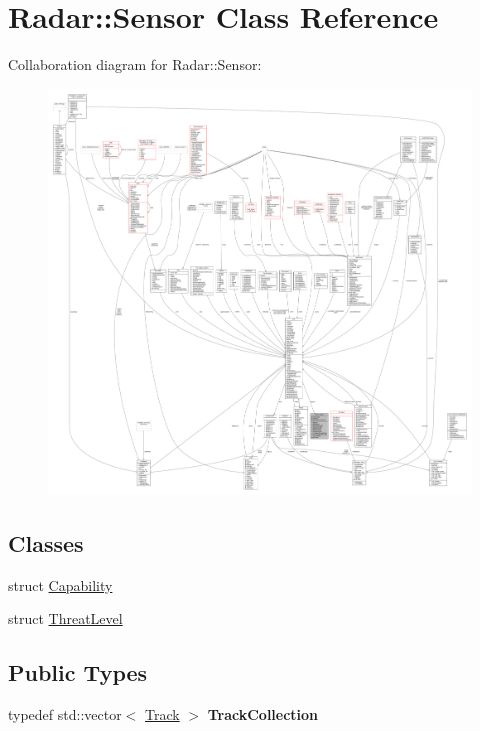 \hypertarget{classRadar_1_1Sensor}{}\section{Radar\+:\+:Sensor Class Reference}
\label{classRadar_1_1Sensor}


Collaboration diagram for Radar\+:\+:Sensor\+:
\nopagebreak
\begin{figure}[H]
\begin{center}
\leavevmode
\includegraphics[width=350pt]{d1/dc8/classRadar_1_1Sensor__coll__graph}
\end{center}
\end{figure}
\subsection*{Classes}
\begin{DoxyCompactItemize}
\item 
struct \hyperlink{structRadar_1_1Sensor_1_1Capability}{Capability}
\item 
struct \hyperlink{structRadar_1_1Sensor_1_1ThreatLevel}{Threat\+Level}
\end{DoxyCompactItemize}
\subsection*{Public Types}
\begin{DoxyCompactItemize}
\item 
typedef std\+::vector$<$ \hyperlink{classRadar_1_1Track}{Track} $>$ {\bfseries Track\+Collection}\hypertarget{classRadar_1_1Sensor_a7324264482668619cd1268b6b7f29500}{}\label{classRadar_1_1Sensor_a7324264482668619cd1268b6b7f29500}

\end{DoxyCompactItemize}
